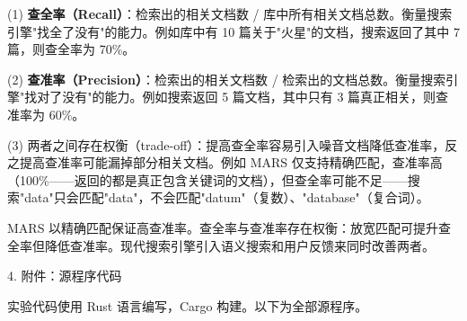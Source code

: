 \noindent\hspace*{2em}(1) \textbf{查全率（Recall）}：检索出的相关文档数 / 库中所有相关文档总数。衡量搜索引擎"找全了没有"的能力。例如库中有 10 篇关于"火星"的文档，搜索返回了其中 7 篇，则查全率为 70\%。\par
\noindent\hspace*{2em}(2) \textbf{查准率（Precision）}：检索出的相关文档数 / 检索出的文档总数。衡量搜索引擎"找对了没有"的能力。例如搜索返回 5 篇文档，其中只有 3 篇真正相关，则查准率为 60\%。\par
\noindent\hspace*{2em}(3) 两者之间存在权衡（trade-off）：提高查全率容易引入噪音文档降低查准率，反之提高查准率可能漏掉部分相关文档。例如 MARS 仅支持精确匹配，查准率高（100\%——返回的都是真正包含关键词的文档），但查全率可能不足——搜索"data"只会匹配"data"，不会匹配"datum"（复数）、"database"（复合词）。\par
\noindent\hspace*{2em}MARS 以精确匹配保证高查准率。查全率与查准率存在权衡：放宽匹配可提升查全率但降低查准率。现代搜索引擎引入语义搜索和用户反馈来同时改善两者。\par
\noindent\hspace*{2em}4. 附件：源程序代码\par
\noindent\hspace*{2em}实验代码使用 Rust 语言编写，Cargo 构建。以下为全部源程序。\par
